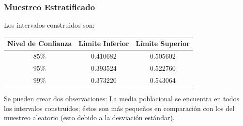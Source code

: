 \documentclass[12pt,a4paper]{article}
\begin{document}
    \subsubsection{Muestreo Estratificado}
        Los intervalos construidos son:
        \begin{center}
            \begin{tabular}{|c|c|c|}
                \hline
                Nivel de Confianza & Límite Inferior & Límite Superior \\
                \hline
                $85\%$ & 0.410682 & 0.505602 \\
                $95\%$ & 0.393524 & 0.522760 \\
                $99\%$ & 0.373220 & 0.543064 \\
                \hline
                \end{tabular}
        \end{center}
        Se pueden crear dos observaciones: La media 
        poblacional se encuentra en todos los intervalos 
        construidos; éstos son más pequeños en comparación 
        con los del muestreo aleatorio (esto debido a la 
        desviación estándar).

\newpage
\end{document}
